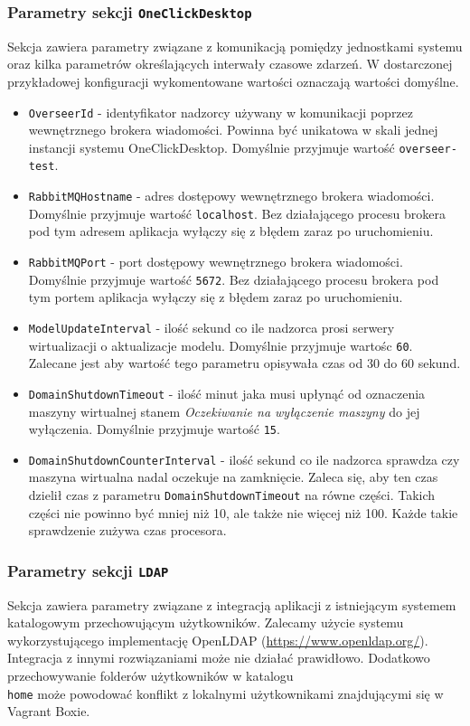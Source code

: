 \documentclass[../opis-rozwiazania.tex]{subfiles}
\begin{document}
\subsubsection{Parametry sekcji \texttt{OneClickDesktop}}
Sekcja zawiera parametry związane z komunikacją pomiędzy jednostkami systemu oraz kilka parametrów określających interwały czasowe zdarzeń.
W dostarczonej przykładowej konfiguracji wykomentowane wartości oznaczają wartości domyślne.
\begin{itemize}
  \item \texttt{OverseerId} - identyfikator nadzorcy używany w komunikacji poprzez wewnętrznego brokera wiadomości. Powinna być unikatowa w skali jednej instancji systemu OneClickDesktop. Domyślnie przyjmuje wartość \texttt{overseer-test}.
  \item \texttt{RabbitMQHostname} - adres dostępowy wewnętrznego brokera wiadomości. Domyślnie przyjmuje wartość \texttt{localhost}. Bez działającego procesu brokera pod tym adresem aplikacja wyłączy się z błędem zaraz po uruchomieniu.
  \item \texttt{RabbitMQPort} - port dostępowy wewnętrznego brokera wiadomości. Domyślnie przyjmuje wartość \texttt{5672}. Bez działającego procesu brokera pod tym portem aplikacja wyłączy się z błędem zaraz po uruchomieniu.
  \item \texttt{ModelUpdateInterval} - ilość sekund co ile nadzorca prosi serwery wirtualizacji o aktualizacje modelu. Domyślnie przyjmuje wartośc \texttt{60}. Zalecane jest aby wartość tego parametru opisywała czas od 30 do 60 sekund.																												%
  \item \texttt{DomainShutdownTimeout} - ilość minut jaka musi upłynąć od oznaczenia maszyny wirtualnej stanem \textit{Oczekiwanie na wyłączenie maszyny} do jej wyłączenia. Domyślnie przyjmuje wartość \texttt{15}.
  \item \texttt{DomainShutdownCounterInterval} - ilość sekund co ile nadzorca sprawdza czy maszyna wirtualna nadal oczekuje na zamknięcie. Zaleca się, aby ten czas dzielił czas z parametru \texttt{DomainShutdownTimeout} na równe części. Takich części nie powinno być mniej niż 10, ale także nie więcej niż 100. Każde takie sprawdzenie zużywa czas procesora.
\end{itemize}

\subsubsection{Parametry sekcji \texttt{LDAP}}
Sekcja zawiera parametry związane z integracją aplikacji z istniejącym systemem katalogowym przechowującym użytkowników. Zalecamy użycie systemu wykorzystującego implementację OpenLDAP (\url{https://www.openldap.org/}). Integracja z innymi rozwiązaniami może nie działać prawidłowo. Dodatkowo przechowywanie folderów użytkowników w katalogu \texttt{\\home} może powodować konflikt z lokalnymi użytkownikami znajdującymi się w Vagrant Boxie.
\end{document}
